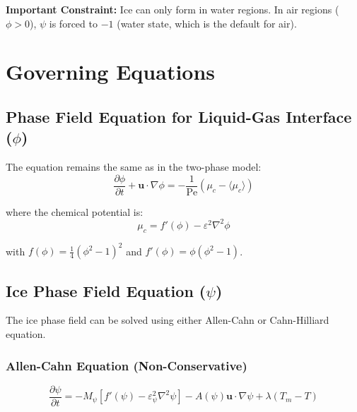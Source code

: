 \documentclass[12pt]{article}
\begin{document}
\textbf{Important Constraint:} Ice can only form in water regions. In air regions ($\phi > 0$), $\psi$ is forced to $-1$ (water state, which is the default for air).

\section{Governing Equations}

\subsection{Phase Field Equation for Liquid-Gas Interface ($\phi$)}

The equation remains the same as in the two-phase model:
\begin{equation}
\frac{\partial \phi}{\partial t} + \mathbf{u} \cdot \nabla \phi = -\frac{1}{\text{Pe}} \left( \mu_c - \langle \mu_c \rangle \right)
\label{eq:phase_field_three}
\end{equation}

where the chemical potential is:
\begin{equation}
\mu_c = f'(\phi) - \varepsilon^2 \nabla^2 \phi
\label{eq:chemical_potential_three}
\end{equation}

with $f(\phi) = \frac{1}{4}(\phi^2 - 1)^2$ and $f'(\phi) = \phi(\phi^2 - 1)$.

\subsection{Ice Phase Field Equation ($\psi$)}

The ice phase field can be solved using either Allen-Cahn or Cahn-Hilliard equation.

\subsubsection{Allen-Cahn Equation (Non-Conservative)}

\begin{equation}
\frac{\partial \psi}{\partial t} = -M_\psi \left[ f'(\psi) - \varepsilon_\psi^2 \nabla^2 \psi \right] - A(\psi) \mathbf{u} \cdot \nabla \psi + \lambda (T_m - T)
\label{eq:ice_allen_cahn}
\end{equation}
\end{document}
